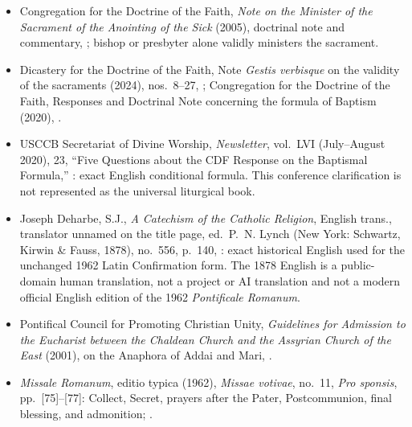 {\begin{itemize}[nosep]
\item Congregation for the Doctrine of the Faith, \emph{Note on the Minister of the Sacrament of the Anointing of the Sick} (2005), doctrinal note and commentary, ; bishop or presbyter alone validly ministers the sacrament.
\item Dicastery for the Doctrine of the Faith, Note \emph{Gestis verbisque} on the validity of the sacraments (2024), nos.~8--27, ; Congregation for the Doctrine of the Faith, Responses and Doctrinal Note concerning the formula of Baptism (2020), .
\item USCCB Secretariat of Divine Worship, \emph{Newsletter}, vol.~LVI (July--August 2020), 23, ``Five Questions about the CDF Response on the Baptismal Formula,'' : exact English conditional formula. This conference clarification is not represented as the universal liturgical book.
\item Joseph Deharbe, S.J., \emph{A Catechism of the Catholic Religion}, English trans., translator unnamed on the title page, ed.~P.~N. Lynch (New York: Schwartz, Kirwin \& Fauss, 1878), no.~556, p.~140, : exact historical English used for the unchanged 1962 Latin Confirmation form. The 1878 English is a public-domain human translation, not a project or AI translation and not a modern official English edition of the 1962 \emph{Pontificale Romanum}.
\item Pontifical Council for Promoting Christian Unity, \emph{Guidelines for Admission to the Eucharist between the Chaldean Church and the Assyrian Church of the East} (2001), on the Anaphora of Addai and Mari, .
\item \emph{Missale Romanum}, editio typica (1962), \emph{Missae votivae}, no.~11, \emph{Pro sponsis}, pp.~[75]--[77]: Collect, Secret, prayers after the Pater, Postcommunion, final blessing, and admonition; .

\end{itemize}}
